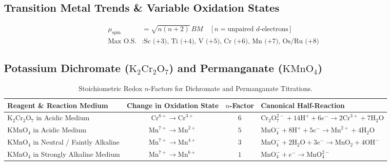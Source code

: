 \documentclass[10pt,twoside,openright]{book}
\begin{document}
\subsection{Transition Metal Trends \& Variable Oxidation States}

\begin{formulabox}
\begin{align}
  \mu_{\text{spin}} &= \sqrt{n(n + 2)}\,\si{BM} \quad [n = \text{unpaired } d\text{-electrons}] \\
  \text{Max O.S.} &: \text{Sc (+3), Ti (+4), V (+5), Cr (+6), Mn (+7), Os/Ru (+8)}
\end{align}
\end{formulabox}

\subsection{Potassium Dichromate ($\mathrm{K_2Cr_2O_7}$) and Permanganate ($\mathrm{KMnO_4}$)}

\begin{table}[htbp]
\centering
\small
\renewcommand{\arraystretch}{1.3}
\begin{tabularx}{\textwidth}{L c c Y}
\toprule
\textbf{Reagent \& Reaction Medium} & \textbf{Change in Oxidation State} & $n$\textbf{-Factor} & \textbf{Canonical Half-Reaction} \\
\midrule
$\text{K}_2\text{Cr}_2\text{O}_7$ in Acidic Medium & $\text{Cr}^{6+} \to \text{Cr}^{3+}$ & $6$ & $\text{Cr}_2\text{O}_7^{2-} + 14\text{H}^+ + 6e^- \to 2\text{Cr}^{3+} + 7\text{H}_2\text{O}$ \\
$\text{KMnO}_4$ in Acidic Medium & $\text{Mn}^{7+} \to \text{Mn}^{2+}$ & $5$ & $\text{MnO}_4^- + 8\text{H}^+ + 5e^- \to \text{Mn}^{2+} + 4\text{H}_2\text{O}$ \\
$\text{KMnO}_4$ in Neutral / Faintly Alkaline & $\text{Mn}^{7+} \to \text{Mn}^{4+}$ & $3$ & $\text{MnO}_4^- + 2\text{H}_2\text{O} + 3e^- \to \text{MnO}_2 + 4\text{OH}^-$ \\
$\text{KMnO}_4$ in Strongly Alkaline Medium & $\text{Mn}^{7+} \to \text{Mn}^{6+}$ & $1$ & $\text{MnO}_4^- + e^- \to \text{MnO}_4^{2-}$ \\
\bottomrule
\end{tabularx}
\caption{Stoichiometric Redox $n$-Factors for Dichromate and Permanganate Titrations.}
\end{table}
\end{document}
